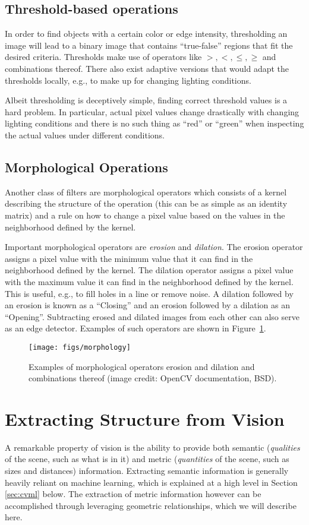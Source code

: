 \subsection{Threshold-based operations}
In order to find objects with a certain color or edge intensity, thresholding an image will lead to a binary image that contains ``true-false'' regions that fit the desired criteria. Thresholds make use of operators like $>,<,\leq,\geq$ and combinations thereof. There also exist adaptive versions that would adapt the thresholds locally, e.g., to make up for changing lighting conditions.

Albeit thresholding is deceptively simple, finding correct threshold values is a hard problem. In particular, actual pixel values change drastically with changing lighting conditions and there is no such thing as ``red'' or ``green'' when inspecting the actual values under different conditions.

\subsection{Morphological Operations}
Another class of filters are morphological operators which consists of a kernel describing the structure of the operation (this can be as simple as an identity matrix) and a rule on how to change a pixel value based on the values in the neighborhood defined by the kernel.

Important morphological operators are \emph{erosion} and \emph{dilation}. The erosion operator assigns a pixel value with the minimum value that it can find in the neighborhood defined by the kernel. The dilation operator assigns a pixel value with the maximum value it can find in the neighborhood defined by the kernel. This is useful, e.g., to fill holes in a line or remove noise. A dilation followed by an erosion is known as a ``Closing'' and an erosion followed by a dilation as an ``Opening''. Subtracting erosed and dilated images from each other can also serve as an edge detector. Examples of such operators are shown in Figure~\ref{fig:morphology}.

\begin{figure}
    \centering
    \texttt{[image: figs/morphology]}
    \caption{Examples of morphological operators erosion and dilation and combinations thereof (image credit: OpenCV documentation, BSD).
    \label{fig:morphology}}
\end{figure}

\section{Extracting Structure from Vision}\label{sec:vision:structure}
A remarkable property of vision is the ability to provide both semantic (\emph{qualities} of the scene, such as what is in it) and metric (\emph{quantities} of the scene, such as sizes and distances) information. Extracting semantic information is generally heavily reliant on machine learning, which is explained at a high level in Section \ref{sec:cvml} below. The extraction of metric information however can be accomplished through leveraging geometric relationships, which we will describe here.

